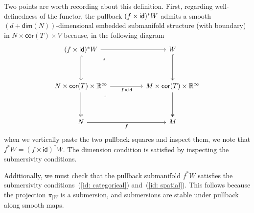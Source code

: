 \begin{remark}
    Two points are worth recording about this definition. First, regarding well-definedness of the functor, the pullback $(f\times \operatorname{\sf id})^*W$ admits a smooth $(d+\mathsf{dim}(N))$-dimensional embedded submanifold structure (with boundary) in $N\times \mathsf{cor}(T) \times V$ because, in the following diagram
    \begin{equation}
        \begin{tikzcd}[ampersand replacement=\&]
            {(f\times \id)^\ast W} \&\& W \\
            \\
            {N\times \mathsf{cor}(T) \times \RR^{\oo}} \&\& {M\times \mathsf{cor}(T) \times \RR^{\oo}} \\
            \\
            N \&\& M
            \arrow[from=1-1, to=1-3]
            \arrow[hook, from=1-1, to=3-1]
            \arrow["\lrcorner"{anchor=center, pos=0.125}, draw=none, from=1-1, to=3-3]
            \arrow[hook, from=1-3, to=3-3]
            \arrow["{f\times \id}"', from=3-1, to=3-3]
            \arrow[two heads, from=3-1, to=5-1]
            \arrow["\lrcorner"{anchor=center, pos=0.125}, draw=none, from=3-1, to=5-3]
            \arrow[two heads, from=3-3, to=5-3]
            \arrow["f"', from=5-1, to=5-3]
        \end{tikzcd}
    \end{equation}
    when we vertically paste the two pullback squares and inspect them, we note that $f^\ast W = (f\times \mathsf{id})^\ast W$. The dimension condition is satisfied by inspecting the submersivity conditions.

    \medskip

    Additionally, we must check that the pullback submanifold $f^*W$ satisfies the submersivity conditions~(\ref{id: categorical}) and~(\ref{id: spatial}). This follows because the projection $\pi_{|W}$ is a submersion, and submersions are stable under pullback along smooth maps. 
    
    \medskip


\end{remark}
